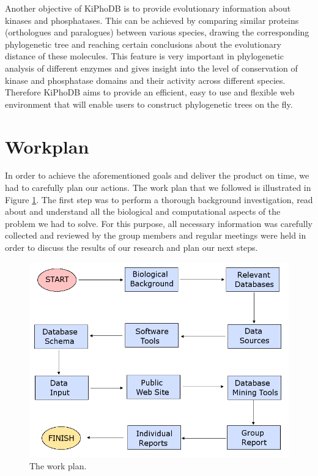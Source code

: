 Another objective of KiPhoDB is to provide evolutionary information about kinases and phosphatases.
This can be achieved by comparing similar proteins (orthologues and paralogues) between various species, drawing the corresponding phylogenetic tree
and reaching certain conclusions about the evolutionary distance of these molecules.
This feature is very important in phylogenetic analysis of different enzymes and gives insight into the level of conservation of kinase and phosphatase domains and
their activity across different species.
Therefore KiPhoDB aims to provide an efficient, easy to use and flexible web environment that will enable users to construct phylogenetic trees on the fly.

\section{Workplan}
In order to achieve the aforementioned goals and deliver the product on time, we had to carefully plan our actions.
The work plan that we followed is illustrated in Figure \ref{workplan}.
The first step was to perform a thorough background investigation, read about and understand all the biological and computational aspects of the problem we had to solve.
For this purpose, all necessary information was carefully collected and reviewed by the group members and regular meetings were held in order to discuss the results of our research and plan our next steps.

\begin{figure}[htp]
\centering
\includegraphics[scale=0.5]{pictures/workplan.png}
\caption{The work plan.}
\label{workplan}
\end{figure}

